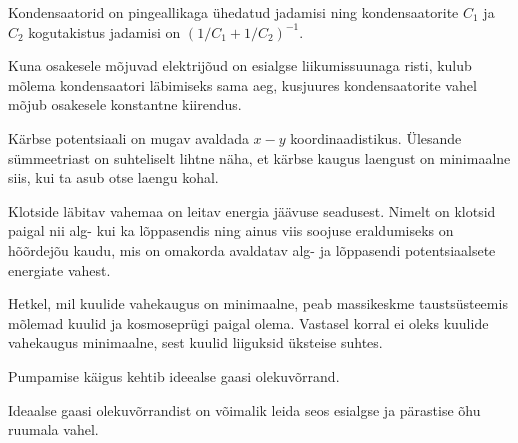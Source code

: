 \documentclass[10pt, twoside]{article}
\begin{document}
{
\hint
Kondensaatorid on pingeallikaga ühedatud jadamisi ning kondensaatorite $C_1$ ja $C_2$ kogutakistus jadamisi on $\left( 1/C_1 + 1/C_2 \right) ^{-1}$. 

Kuna osakesele mõjuvad elektrijõud on esialgse liikumissuunaga risti, kulub mõlema kondensaatori läbimiseks sama aeg, kusjuures kondensaatorite vahel mõjub osakesele konstantne kiirendus.
\probend
\bigskip


\hint
Kärbse potentsiaali on mugav avaldada $x-y$ koordinaadistikus. Ülesande sümmeetriast on suhteliselt lihtne näha, et kärbse kaugus laengust on minimaalne siis, kui ta asub otse laengu kohal.
\probend
\bigskip


\hint
Klotside läbitav vahemaa on leitav energia jäävuse seadusest. Nimelt on klotsid paigal nii alg- kui ka lõppasendis ning ainus viis soojuse eraldumiseks on hõõrdejõu kaudu, mis on omakorda avaldatav alg- ja lõppasendi potentsiaalsete energiate vahest.
\probend
\bigskip


\hint
Hetkel, mil kuulide vahekaugus on minimaalne, peab massikeskme taustsüsteemis mõlemad kuulid ja kosmoseprügi paigal olema. Vastasel korral ei oleks kuulide vahekaugus minimaalne, sest kuulid liiguksid üksteise suhtes.
\probend
\bigskip


\hint
Pumpamise käigus kehtib ideealse gaasi olekuvõrrand.
\probend
\bigskip


\hint
Ideaalse gaasi olekuvõrrandist on võimalik leida seos esialgse ja pärastise õhu ruumala vahel.
\probend
\bigskip


}
\end{document}
